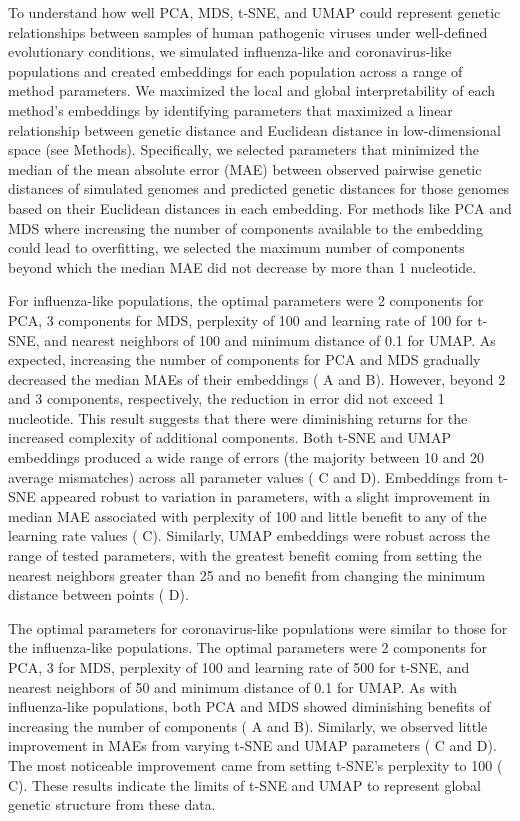 \documentclass[10pt,letterpaper]{article}
\begin{document}
To understand how well PCA, MDS, t-SNE, and UMAP could represent genetic relationships between samples of human pathogenic viruses under well-defined evolutionary conditions, we simulated influenza-like and coronavirus-like populations and created embeddings for each population across a range of method parameters.
We maximized the local and global interpretability of each method's embeddings by identifying parameters that maximized a linear relationship between genetic distance and Euclidean distance in low-dimensional space (see Methods).
Specifically, we selected parameters that minimized the median of the mean absolute error (MAE) between observed pairwise genetic distances of simulated genomes and predicted genetic distances for those genomes based on their Euclidean distances in each embedding.
For methods like PCA and MDS where increasing the number of components available to the embedding could lead to overfitting, we selected the maximum number of components beyond which the median MAE did not decrease by more than 1 nucleotide.

For influenza-like populations, the optimal parameters were 2 components for PCA, 3 components for MDS, perplexity of 100 and learning rate of 100 for t-SNE, and nearest neighbors of 100 and minimum distance of 0.1 for UMAP.
As expected, increasing the number of components for PCA and MDS gradually decreased the median MAEs of their embeddings ( A and B).
However, beyond 2 and 3 components, respectively, the reduction in error did not exceed 1 nucleotide.
This result suggests that there were diminishing returns for the increased complexity of additional components.
Both t-SNE and UMAP embeddings produced a wide range of errors (the majority between 10 and 20 average mismatches) across all parameter values ( C and D).
Embeddings from t-SNE appeared robust to variation in parameters, with a slight improvement in median MAE associated with perplexity of 100 and little benefit to any of the learning rate values ( C).
Similarly, UMAP embeddings were robust across the range of tested parameters, with the greatest benefit coming from setting the nearest neighbors greater than 25 and no benefit from changing the minimum distance between points ( D).

The optimal parameters for coronavirus-like populations were similar to those for the influenza-like populations.
The optimal parameters were 2 components for PCA, 3 for MDS, perplexity of 100 and learning rate of 500 for t-SNE, and nearest neighbors of 50 and minimum distance of 0.1 for UMAP.
As with influenza-like populations, both PCA and MDS showed diminishing benefits of increasing the number of components ( A and B).
Similarly, we observed little improvement in MAEs from varying t-SNE and UMAP parameters ( C and D).
The most noticeable improvement came from setting t-SNE's perplexity to 100 ( C).
These results indicate the limits of t-SNE and UMAP to represent global genetic structure from these data.
\end{document}
